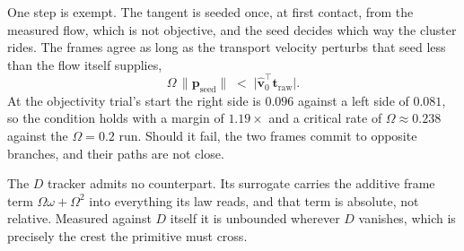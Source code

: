 \documentclass[lettersize,journal]{IEEEtran}
\begin{document}
One step is exempt. The tangent is seeded once, at first contact, from
the measured flow, which is not objective, and the seed decides which way
the cluster rides. The frames agree as long as the transport velocity
perturbs that seed less than the flow itself supplies,
\begin{equation}
    \Omega\,\lVert\mathbf{p}_{\text{seed}}\rVert
    \;<\; \lvert\hat{\mathbf{v}}_0^\top\mathbf{t}_{\text{raw}}\rvert .
\end{equation}
At the objectivity trial's start the right side is $0.096$ against a left
side of $0.081$, so the condition holds with a margin of $1.19\times$ and
a critical rate of $\Omega \approx 0.238$ against the $\Omega = 0.2$ run. Should it fail, the two frames commit to opposite
branches, and their paths are not close.

The $D$ tracker admits no counterpart. Its surrogate carries the additive
frame term $\Omega\omega + \Omega^2$ into
everything its law reads, and that term is absolute, not relative.
Measured against $D$ itself it is unbounded wherever $D$ vanishes, which
is precisely the crest the primitive must cross.
\end{document}
